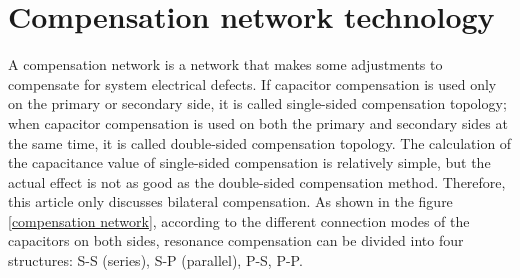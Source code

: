 \section{Compensation network technology}
A compensation network is a network that makes some adjustments to compensate for system electrical defects. If capacitor compensation is used only on the primary or secondary side, it is called single-sided compensation topology; when capacitor compensation is used on both the primary and secondary sides at the same time, it is called double-sided compensation topology. The calculation of the capacitance value of single-sided compensation is relatively simple, but the actual effect is not as good as the double-sided compensation method. Therefore, this article only discusses bilateral compensation. As shown in the figure \ref{compensation network}, according to the different connection modes of the capacitors on both sides, resonance compensation can be divided into four structures: S-S (series), S-P (parallel), P-S, P-P.

